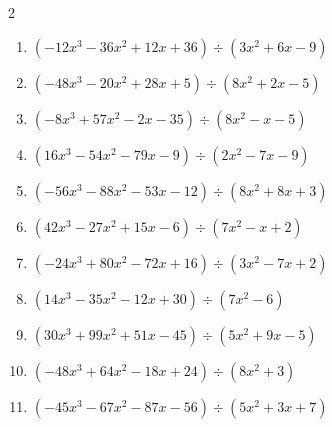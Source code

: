 \begin{multicols}{2}
\begin{enumerate}
  \item $(-12x^{3}-36x^{2}+12x+36) \div (3x^{2}+6x-9)$

        \phantom{$商 : -4x-4, \quad 剰余 : 6x+9$}

\columnbreak %

  \item $(-48x^{3}-20x^{2}+28x+5) \div (8x^{2}+2x-5)$

        \phantom{$商 : -6x-1, \quad 剰余 : -5x+2$}

  \item $(-8x^{3}+57x^{2}-2x-35) \div (8x^{2}-x-5)$

        \phantom{$商 : -x+7, \quad 剰余 : 8x-4$}

  \item $(16x^{3}-54x^{2}-79x-9) \div (2x^{2}-7x-9)$

        \phantom{$商 : 8x+1, \quad 剰余 : 2x+6$}

  \item $(-56x^{3}-88x^{2}-53x-12) \div (8x^{2}+8x+3)$

        \phantom{$商 : -7x-4, \quad 剰余 : x+8$}

  \item $(42x^{3}-27x^{2}+15x-6) \div (7x^{2}-x+2)$

        \phantom{$商 : 6x-3, \quad 剰余 : 9x+5$}

\columnbreak %

\resetques

  \item $(-24x^{3}+80x^{2}-72x+16) \div (3x^{2}-7x+2)$

        \phantom{$商 : -8x+8, \quad 剰余 : -x-2$}

  \item $(14x^{3}-35x^{2}-12x+30) \div (7x^{2}-6)$

        \phantom{$商 : 2x-5, \quad 剰余 : -8x+7$}

  \item $(30x^{3}+99x^{2}+51x-45) \div (5x^{2}+9x-5)$

        \phantom{$商 : 6x+9, \quad 剰余 : -3x+3$}

  \item $(-48x^{3}+64x^{2}-18x+24) \div (8x^{2}+3)$

        \phantom{$商 : -6x+8, \quad 剰余 : 3$}

  \item $(-45x^{3}-67x^{2}-87x-56) \div (5x^{2}+3x+7)$

        \phantom{$商 : -9x-8, \quad 剰余 : 5x+6$}


\end{enumerate}
\end{multicols}
